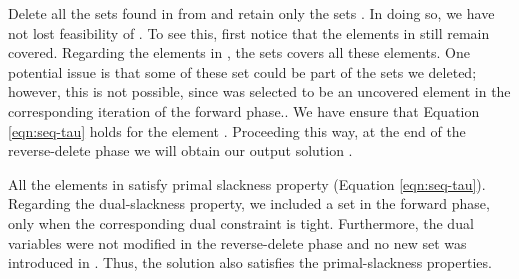 \documentclass[11pt]{article}
\begin{document}
Delete all the sets found in  from  and retain only the sets .
In doing so, we have not lost feasibility of . To see this, first notice that the elements in  still remain
covered. Regarding the elements in , 
the sets  covers all these elements.
One potential issue is that some of these set could be part of the sets we deleted;
however, this is not possible, since  was selected to be an uncovered element in the corresponding iteration
of the forward phase..
We have ensure that Equation \ref{eqn:seq-tau} holds for the element .
Proceeding this way, at the end of the reverse-delete phase we will obtain our output solution .

All the elements in  satisfy primal slackness property (Equation \ref{eqn:seq-tau}). 
Regarding the dual-slackness property, we included a set  in the forward phase,
only when the corresponding dual constraint is tight. 
Furthermore, the dual variables were not modified in the reverse-delete phase
and no new set was introduced in .
Thus, the solution  also satisfies the primal-slackness properties.
\end{document}
